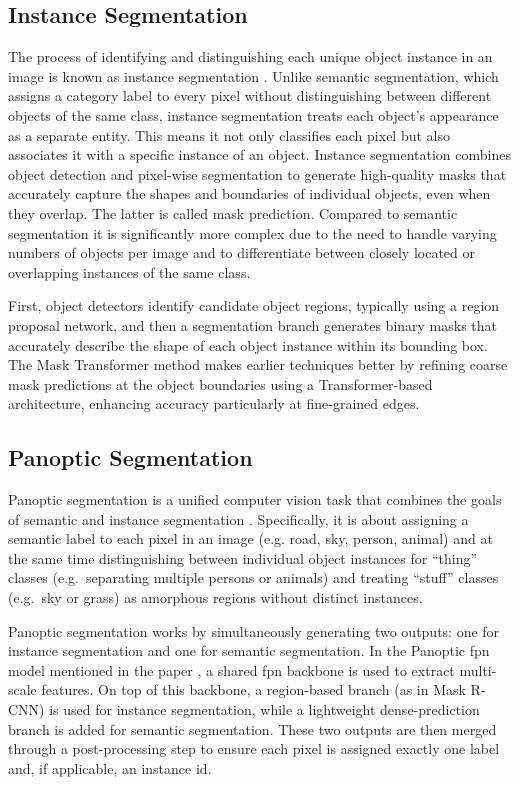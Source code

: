 \subsection{Instance Segmentation}
The process of identifying and distinguishing each unique object instance in an image is known as instance segmentation  \cite{ke2021masktransfinerhighqualityinstance}. Unlike semantic segmentation, which assigns a category label to every pixel without distinguishing between different objects of the same class, instance segmentation treats each object's appearance as a separate entity. This means it not only classifies each pixel but also associates it with a specific instance of an object. Instance segmentation combines object detection and pixel-wise segmentation to generate high-quality masks that accurately capture the shapes and boundaries of individual objects, even when they overlap. The latter is called mask prediction. Compared to semantic segmentation it is significantly more complex due to the need to handle varying numbers of objects per image and to differentiate between closely located or overlapping instances of the same class.

\medskip

First, object detectors identify candidate object regions, typically using a region proposal network, and then a segmentation branch generates binary masks that accurately describe the shape of each object instance within its bounding box. The Mask Transformer method makes earlier techniques better by refining coarse mask predictions at the object boundaries using a Transformer-based architecture, enhancing accuracy particularly at fine-grained edges.


\subsection{Panoptic Segmentation}
Panoptic segmentation is a unified computer vision task that combines the goals of semantic and instance segmentation \cite{kirillov2019panopticfeaturepyramidnetworks}. Specifically, it is about assigning a semantic label to each pixel in an image (e.g. road, sky, person, animal) and at the same time distinguishing between individual object instances for \enquote{thing} classes (e.g.~separating multiple persons or animals) and treating \enquote{stuff} classes (e.g.~sky or grass) as amorphous regions without distinct instances.

\medskip

Panoptic segmentation works by simultaneously generating two outputs: one for instance segmentation and one for semantic segmentation. In the Panoptic \gls{fpn} model mentioned in the paper \cite{kirillov2019panopticfeaturepyramidnetworks}, a shared \gls{fpn} backbone is used to extract multi-scale features. On top of this backbone, a region-based branch (as in Mask R-CNN) is used for instance segmentation, while a lightweight dense-prediction branch is added for semantic segmentation. These two outputs are then merged through a post-processing step to ensure each pixel is assigned exactly one label and, if applicable, an instance \acrshort{id}.

